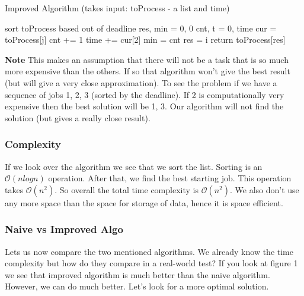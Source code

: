 \documentclass[11pt]{article}
\begin{document}
{				
				\begin{algorithm}
					\caption{Improved Algorithm (takes input: toProcess - a list and time)}
					\begin{algorithmic}[1] 
						\STATE sort toProcess based out of deadline
						\STATE res, min = 0, 0
						\STATE cnt, t = 0, time
						\STATE cur = toProcess[j]
						\STATE cnt += 1
						\STATE time += cur[2]
						\ELSE
						\STATE min = cnt
						\STATE res = i
						\ENDIF
						\ENDIF
						\ENDFOR
						\ENDFOR
						\STATE return toProcess[res]
					\end{algorithmic}
				\end{algorithm}
				
				\textbf{Note} This makes an assumption that there will not be a task that is so much more expensive than the others. If so that algorithm won't give the best result (but will give a very close approximation). To see the problem if we have a sequence of jobs  1, 2, 3 (sorted by the deadline). If 2 is computationally very expensive then the best solution will be 1, 3. Our algorithm will not find the solution (but gives a really close result).
				
				\subsubsection{Complexity}
				If we look over the algorithm we see that we sort the list. Sorting is an $\mathcal{O}(nlogn)$ operation.
				After that, we find the best starting job. This operation takes $\mathcal{O}(n^2)$. So overall the total time complexity is $\mathcal{O}(n^2)$. We also don't use any more space than the space for storage of data, hence it is space efficient.
				
				\subsubsection{Naive vs Improved Algo}
				Lets us now compare the two mentioned algorithms. We already know the time complexity but how do they compare in a real-world test? If you look at figure 1 we see that improved algorithm is much better than the naive algorithm. However, we can do much better. Let's look for a more optimal solution.
				
}
\end{document}
